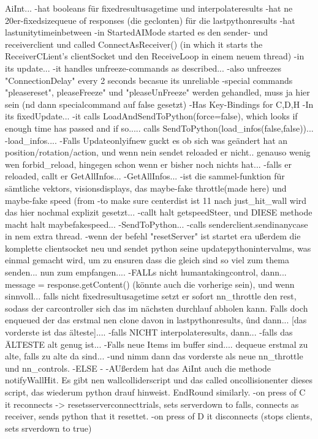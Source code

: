 AiInt...
-hat booleans für fixedresultusagetime und interpolateresults
-hat ne 20er-fixedsizequeue of responses (die geclonten) für die lastpythonresults
-hat lastunitytimeinbetween
-in StartedAIMode started es den sender- und receiverclient und called ConnectAsReceiver() (in which it starts the ReceiverCLient's clientSocket und den ReceiveLoop in einem neuem thread)
-in its update...
	-it handles unfreeze-commands as described...
	-also unfreezes "ConnectionDelay" every 2 seconds becasue its unreliable
	-special commands "pleasereset", pleaseFreeze" und "pleaseUnFreeze" werden gehandled, muss ja hier sein (nd dann specialcommand auf false gesetzt)
-Has Key-Bindings for C,D,H
-In its fixedUpdate...
	-it calls LoadAndSendToPython(force=false), which looks if enough time has passed and if so..... calls SendToPython(load_infos(false,false))... 
		-load_infos....
			-Falls Updateonlyifnew guckt es ob sich was geändert hat an position/rotation/action, und wenn nein sendet reloaded er nicht.. genauso wenig wen forbid_reload, hingegen schon wenn er bisher noch nichts hat...
			-falls er reloaded, callt er GetAllInfos...
			-GetAllInfos...
				-ist die sammel-funktion für sämtliche vektors, visionsdisplays, das maybe-fake throttle(made here) und maybe-fake speed (from 
				-to make sure centerdist ist 11 nach just_hit_wall wird das hier nochmal explizit gesetzt...
				-callt  halt getspeedSteer, und DIESE methode macht halt maybefakespeed...
		-SendToPython...
			-calls senderclient.sendinanycase in nem extra thread.
			-wenn der befehl "resetServer" ist startet era ußerdem die komplette clientsocket neu und sendet python seine updatepythonintervalms, was einmal gemacht wird, um zu ensuren dass die gleich sind
	so viel zum thema senden... nun zum empfangen....
	-FALLs nicht humantakingcontrol, dann...
		message = response.getContent() (könnte auch die vorherige sein), und wenn sinnvoll...
		falls nicht fixedresultusagetime setzt er sofort nn_throttle den rest, sodass der carcontroller sich das im nächsten durchlauf abholen kann. 
		Falls doch enqueued der das erstmal nen clone davon in lastpythonresults, ûnd dann... [das vorderste ist das älteste]....
			-falls NICHT interpolateresults, dann...
				-falls das ÄLTESTE alt genug ist...
			 	-Falls neue Items im buffer sind.... dequeue erstmal zu alte, falls zu alte da sind...
			 	-und nimm dann das vorderste als neue nn_throttle und nn_controls.
			 -ELSE
			 	-
-AUßerdem hat das AiInt auch die methode notifyWallHit. Es gibt nen wallcolliderscript und das called oncollisionenter dieses script, das wiederum python drauf hinweist. EndRound similarly.
-on press of C it reconnects -> resetsserverconnecttrials, sets serverdown to falls, connects as receiver, sends python that it resettet.
-on press of D it disconnects (stops clients, sets srverdown to true)
			
